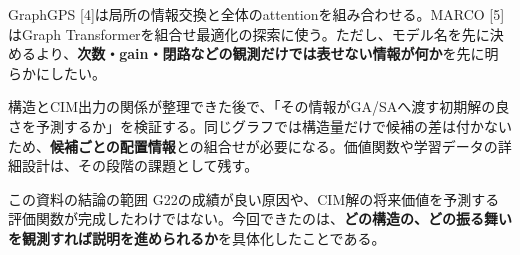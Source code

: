 GraphGPS [4]は局所の情報交換と全体のattentionを組み合わせる。MARCO [5]はGraph Transformerを組合せ最適化の探索に使う。ただし、モデル名を先に決めるより、\textbf{次数・gain・閉路などの観測だけでは表せない情報が何か}を先に明らかにしたい。

構造とCIM出力の関係が整理できた後で、「その情報がGA/SAへ渡す初期解の良さを予測するか」を検証する。同じグラフでは構造量だけで候補の差は付かないため、\textbf{候補ごとの配置情報}との組合せが必要になる。価値関数や学習データの詳細設計は、その段階の課題として残す。

\begin{caution}{この資料の結論の範囲}
G22の成績が良い原因や、CIM解の将来価値を予測する評価関数が完成したわけではない。今回できたのは、\textbf{どの構造の、どの振る舞いを観測すれば説明を進められるか}を具体化したことである。
\end{caution}

